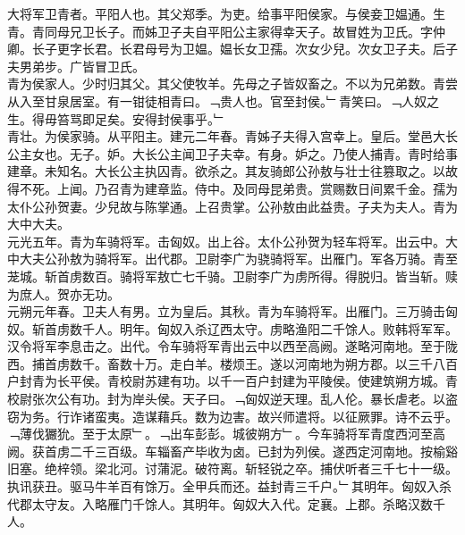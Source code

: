 \documentclass{zhvt-classic}
\begin{document}

\hspace*{2em}大将军卫青者。平阳人也。其父郑季。为吏。给事平阳侯家。与侯妾卫媪通。生青。青同母兄卫长子。而姊卫子夫自平阳公主家得幸天子。故冒姓为卫氏。字仲卿。长子更字长君。长君母号为卫媪。媪长女卫孺。次女少兒。次女卫子夫。后子夫男弟步。广皆冒卫氏。\\
\hspace*{2em}青为侯家人。少时归其父。其父使牧羊。先母之子皆奴畜之。不以为兄弟数。青尝从入至甘泉居室。有一钳徒相青曰。﹁贵人也。官至封侯。﹂青笑曰。﹁人奴之生。得毋笞骂即足矣。安得封侯事乎。﹂\\
\hspace*{2em}青壮。为侯家骑。从平阳主。建元二年春。青姊子夫得入宫幸上。皇后。堂邑大长公主女也。无子。妒。大长公主闻卫子夫幸。有身。妒之。乃使人捕青。青时给事建章。未知名。大长公主执囚青。欲杀之。其友骑郎公孙敖与壮士往篡取之。以故得不死。上闻。乃召青为建章监。侍中。及同母昆弟贵。赏赐数日间累千金。孺为太仆公孙贺妻。少兒故与陈掌通。上召贵掌。公孙敖由此益贵。子夫为夫人。青为大中大夫。\\
\hspace*{2em}元光五年。青为车骑将军。击匈奴。出上谷。太仆公孙贺为轻车将军。出云中。大中大夫公孙敖为骑将军。出代郡。卫尉李广为骁骑将军。出雁门。军各万骑。青至茏城。斩首虏数百。骑将军敖亡七千骑。卫尉李广为虏所得。得脱归。皆当斩。赎为庶人。贺亦无功。\\
\hspace*{2em}元朔元年春。卫夫人有男。立为皇后。其秋。青为车骑将军。出雁门。三万骑击匈奴。斩首虏数千人。明年。匈奴入杀辽西太守。虏略渔阳二千馀人。败韩将军军。汉令将军李息击之。出代。令车骑将军青出云中以西至高阙。遂略河南地。至于陇西。捕首虏数千。畜数十万。走白羊。楼烦王。遂以河南地为朔方郡。以三千八百户封青为长平侯。青校尉苏建有功。以千一百户封建为平陵侯。使建筑朔方城。青校尉张次公有功。封为岸头侯。天子曰。﹁匈奴逆天理。乱人伦。暴长虐老。以盗窃为务。行诈诸蛮夷。造谋藉兵。数为边害。故兴师遣将。以征厥罪。诗不云乎。﹁薄伐玁狁。至于太原﹂。﹁出车彭彭。城彼朔方﹂。今车骑将军青度西河至高阙。获首虏二千三百级。车辎畜产毕收为卤。已封为列侯。遂西定河南地。按榆谿旧塞。绝梓领。梁北河。讨蒲泥。破符离。斩轻锐之卒。捕伏听者三千七十一级。执讯获丑。驱马牛羊百有馀万。全甲兵而还。益封青三千户。﹂其明年。匈奴入杀代郡太守友。入略雁门千馀人。其明年。匈奴大入代。定襄。上郡。杀略汉数千人。\\
\end{document}
